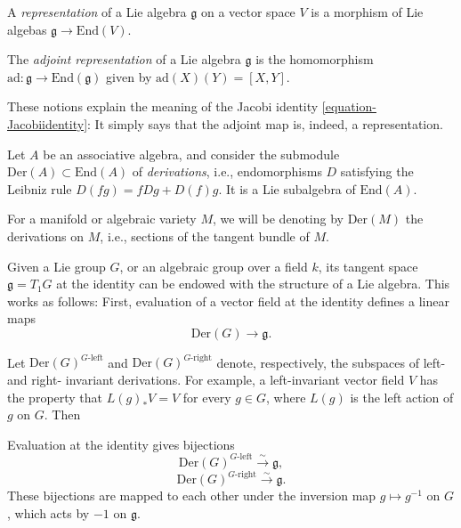 \begin{definition}
 \label{definition-representation-Liealgebra}
A {\it representation} of a Lie algebra $\mathfrak g$ on a vector space $V$ is a morphism of Lie algebas $\mathfrak g \to \text{End}(V)$. 
\end{definition}

\begin{definition}
 \label{definition-adjoint-representation-Liealgebra}
The {\it adjoint representation} of a Lie algebra $\mathfrak g$ is the homomorphism $\text{ad}:\mathfrak g\to \text{End}(\mathfrak g)$ given by $\text{ad}(X)(Y)=[X,Y]$.
\end{definition}


\begin{remark}
\label{remark-Jacobiidentity}
These notions explain the meaning of the Jacobi identity \eqref{equation-Jacobiidentity}: It simply says that the adjoint map is, indeed, a representation.
\end{remark}

\begin{example}
\label{example-derivations}
 Let $A$ be an associative algebra, and consider the submodule $\text{Der}(A)\subset \text{End}(A)$ of \emph{derivations}, i.e., endomorphisms $D$ satisfying the Leibniz rule $D(fg)=f Dg + D(f) g$. It is a Lie subalgebra of $\text{End}(A)$.
\end{example}


For a manifold or algebraic variety $M$, we will be denoting by $\text{Der}(M)$ the derivations on $M$, i.e., sections of the tangent bundle of $M$.

Given a Lie group $G$, or an algebraic group over a field $k$, its tangent space $\mathfrak g = T_1 G$ at the identity can be endowed with the structure of a Lie algebra. This works as follows: First, evaluation of a vector field at the identity defines a linear maps
$$ \text{Der}(G) \to \mathfrak g.$$

Let $\text{Der}(G)^{G\text{-left}}$ and $\text{Der}(G)^{G\text{-right}}$ denote, respectively, the subspaces of left- and right- invariant derivations. For example, a left-invariant vector field $V$ has the property that $L(g)_* V = V$ for every $g\in G$, where $L(g)$ is the left action of $g$ on $G$. Then
\begin{lemma}
 \label{lemma-evaluation-identity}
 Evaluation at the identity gives bijections
 $$ \text{Der}(G)^{G\text{-left}} \xrightarrow\sim \mathfrak g,$$ 
 $$\text{Der}(G)^{G\text{-right}} \xrightarrow\sim\mathfrak g.$$
These bijections are mapped to each other under the inversion map $g\mapsto g^{-1}$ on $G$, which acts by $-1$ on $\mathfrak g$.
\end{lemma}

